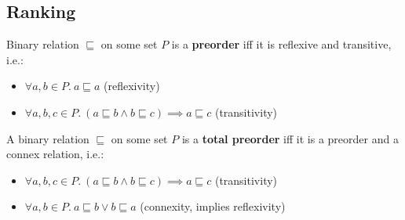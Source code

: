 %
%
%
%

\subsection{Ranking}

\begin{definition}[Preorder]
    Binary relation $\sqsubseteq$ on some set $P$ is a \textbf{preorder} iff it is reflexive and transitive, i.e.:
    \begin{itemize}
        \item $\forall a, b \in P.\ a \sqsubseteq a$ \tabto{7.3cm}(reflexivity)
        \item $\forall a, b, c \in P.\ (a \sqsubseteq b \wedge b \sqsubseteq c) \implies a \sqsubseteq c$ \tabto{7.3cm}(transitivity)
    \end{itemize}
\end{definition}

\begin{definition}
    A binary relation $\sqsubseteq$ on some set $P$ is a \textbf{total preorder} iff it is a preorder and a connex relation, i.e.:
    \begin{itemize}
        \item $\forall a, b, c \in P.\ (a \sqsubseteq b \wedge b \sqsubseteq c) \implies a \sqsubseteq c$ \tabto{7.3cm}(transitivity)
        \item $\forall a, b \in P.\ a \sqsubseteq b \vee b \sqsubseteq a$ \tabto{7.3cm}(connexity, implies reflexivity)
    \end{itemize}
\end{definition}

